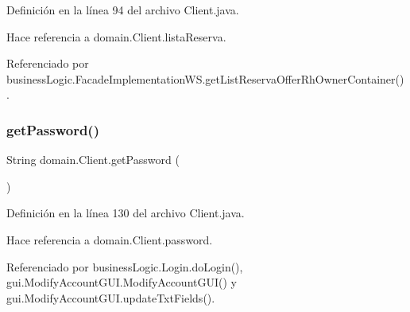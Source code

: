 Definición en la línea 94 del archivo Client.\+java.


\begin{DoxyCode}{0}

\end{DoxyCode}


Hace referencia a domain.\+Client.\+lista\+Reserva.



Referenciado por business\+Logic.\+Facade\+Implementation\+W\+S.\+get\+List\+Reserva\+Offer\+Rh\+Owner\+Container().

\mbox{\label{classdomain_1_1_client_abc586f272267f9312e1341fef8c5486c}} 
\subsubsection{\texorpdfstring{getPassword()}{getPassword()}}
{\footnotesize\ttfamily String domain.\+Client.\+get\+Password (\begin{DoxyParamCaption}{ }\end{DoxyParamCaption})}



Definición en la línea 130 del archivo Client.\+java.


\begin{DoxyCode}{0}

\end{DoxyCode}


Hace referencia a domain.\+Client.\+password.



Referenciado por business\+Logic.\+Login.\+do\+Login(), gui.\+Modify\+Account\+G\+U\+I.\+Modify\+Account\+G\+U\+I() y gui.\+Modify\+Account\+G\+U\+I.\+update\+Txt\+Fields().

\mbox{\label{classdomain_1_1_client_a270e88c8a507605cbf095581ef356e1a}} 
